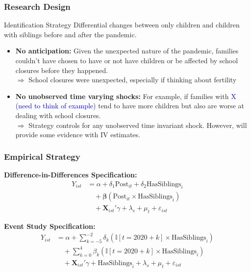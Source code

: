 \documentclass{beamer}
\begin{document}
\begin{frame}
    \label{frame:research}
    \frametitle{Research Design}
    
    \begin{block}{Identification Strategy}
    Differential changes between only children and children with siblings before and after the pandemic.
    \end{block}
    
    \begin{itemize}
         \item<2-> \textbf{No anticipation:} Given the unexpected nature of the pandemic, families couldn't have chosen to have or not have children or be affected by school closures before they happened. \\
         $\Rightarrow$ School closures were unexpected, especially if thinking about fertility
         \item<3-> \textbf{No unobserved time varying shocks:} For example, if families with \textcolor{blue}{X (need to think of example)} tend to have more children but also are worse at dealing with school closures.\\
         $\Rightarrow$ Strategy controls for any unobserved time invariant shock. However, will provide some evidence with IV estimates.
    \end{itemize}

\end{frame}
\begin{frame}
    \label{frame:empirical}
    \frametitle{Empirical Strategy}

    
    \textbf{Difference-in-Differences Specification:}
    \small
    \begin{align}
    Y_{ist} &= \alpha + \delta_1 \text{Post}_{it} + \delta_2 \text{HasSiblings}_{i} \nonumber  \\
    &\quad + \boldsymbol{\beta} (\text{Post}_{it} \times \text{HasSiblings}_{i}) \nonumber \\
    &\quad + \mathbf{X}_{ist}'\gamma + \lambda_s + \mu_t + \varepsilon_{ist}
    \end{align}
    
    \vspace{0.1cm}
    
    \textbf{Event Study Specification:}
    \begin{align}
    Y_{ist} &= \alpha + \sum_{k=-5}^{-2} \delta_k (\mathbb{I}[t = 2020+k] \times \text{HasSiblings}_{i}) \nonumber \\
    & \quad + \sum_{k=0}^{4} \beta_k (\mathbb{I}[t = 2020 + k] \times \text{HasSiblings}_{i}) \nonumber \\
    & \quad + \mathbf{X}_{ist}'\gamma + \text{HasSiblings}_{i} + \lambda_s + \mu_t + \varepsilon_{ist}
    \end{align}
    \normalsize
    
    
\end{frame}
\end{document}
